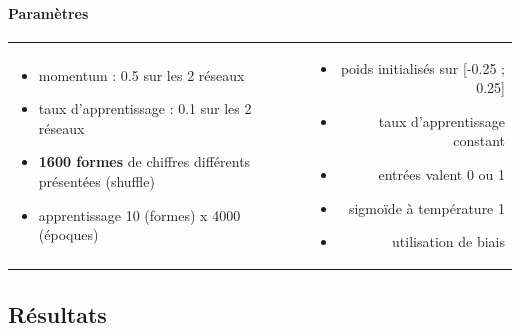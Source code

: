     \paragraph{Paramètres}
      \begin{center}
	\begin{tabular}{lr}
	  \begin{minipage}{230px}
	    \begin{itemize}
	      \item momentum : 0.5 sur les 2 réseaux
	      \item taux d'apprentissage : 0.1 sur les 2 réseaux
	      \item \textbf{1600 formes} de chiffres différents présentées (shuffle) \cite{Handwritten_256}
	      \item apprentissage 10 (formes) x 4000 (époques)
	    \end{itemize}
	  \end{minipage}
	  &
	  \begin{minipage}{230px}
	    \begin{itemize}
	      \item poids initialisés sur [-0.25 ; 0.25]
	      \item taux d'apprentissage constant
	      \item entrées valent 0 ou 1
	      \item sigmoïde à température 1
	      \item utilisation de biais
	    \end{itemize}
	  \end{minipage}
	\end{tabular}
      \end{center}

  
  \newpage
  \subsection{Résultats}
